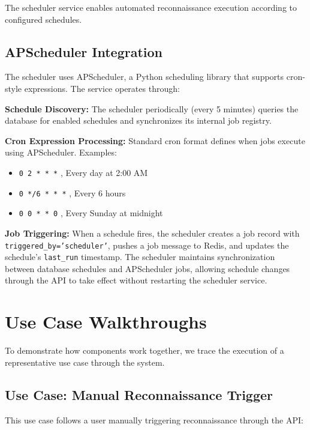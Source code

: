 \documentclass[a4paper,12pt]{report}
\begin{document}
The scheduler service enables automated reconnaissance execution according to configured schedules.

\subsection{APScheduler Integration}

The scheduler uses APScheduler,\cite{apscheduler_docs} a Python scheduling library that supports cron-style expressions. The service operates through:\hfill \break

\textbf{Schedule Discovery:} The scheduler periodically (every 5 minutes) queries the database for enabled schedules and synchronizes its internal job registry.\hfill \break

\textbf{Cron Expression Processing:} Standard cron format defines when jobs execute using APScheduler.\cite{apscheduler_docs} Examples:
\begin{itemize}
\item \texttt{0 2 * * *} ,  Every day at 2:00 AM
\item \texttt{0 */6 * * *} ,  Every 6 hours
\item \texttt{0 0 * * 0} ,  Every Sunday at midnight
\end{itemize}

\textbf{Job Triggering:} When a schedule fires, the scheduler creates a job record with \hfill \break \texttt{triggered\_by='scheduler'}, pushes a job message to Redis, and updates the schedule's \texttt{last\_run} timestamp.
The scheduler maintains synchronization between database schedules and APScheduler jobs, allowing schedule changes through the API to take effect without restarting the scheduler service.\hfill \break

\section{Use Case Walkthroughs}

To demonstrate how components work together, we trace the execution of a representative use case through the system.

\subsection{Use Case: Manual Reconnaissance Trigger}

This use case follows a user manually triggering reconnaissance through the API:\hfill \break
\end{document}

